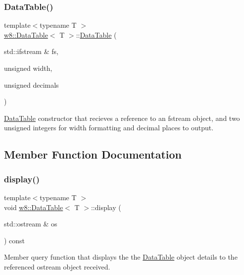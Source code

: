 \subsubsection{\texorpdfstring{Data\+Table()}{DataTable()}}
{\footnotesize\ttfamily template$<$typename T $>$ \\
\mbox{\hyperlink{classw8_1_1DataTable}{w8\+::\+Data\+Table}}$<$ T $>$\+::\mbox{\hyperlink{classw8_1_1DataTable}{Data\+Table}} (\begin{DoxyParamCaption}\item[{std\+::ifstream \&}]{fs,  }\item[{unsigned}]{width,  }\item[{unsigned}]{decimals }\end{DoxyParamCaption})\hspace{0.3cm}{\ttfamily [inline]}}

\mbox{\hyperlink{classw8_1_1DataTable}{Data\+Table}} constructor that recieves a reference to an fstream object, and two unsigned integers for width formatting and decimal places to output. 

\subsection{Member Function Documentation}
\mbox{\label{classw8_1_1DataTable_a5f12eff627602dbff8e3f8a039557fb3}} 
\subsubsection{\texorpdfstring{display()}{display()}}
{\footnotesize\ttfamily template$<$typename T $>$ \\
void \mbox{\hyperlink{classw8_1_1DataTable}{w8\+::\+Data\+Table}}$<$ T $>$\+::display (\begin{DoxyParamCaption}\item[{std\+::ostream \&}]{os }\end{DoxyParamCaption}) const\hspace{0.3cm}{\ttfamily [inline]}}

Member query function that displays the the \mbox{\hyperlink{classw8_1_1DataTable}{Data\+Table}} object details to the referenced ostream object received. \mbox{\label{classw8_1_1DataTable_a39deb646a7ce0e6a91a24d422113f693}} 
